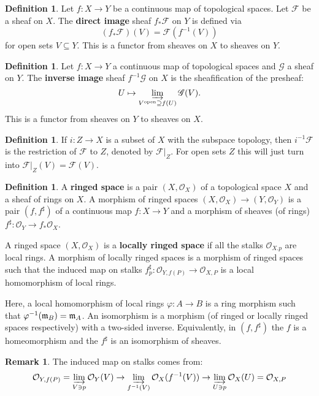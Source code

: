 \documentclass[10pt,reqno]{amsart}
\theoremstyle{definition}
\newtheorem{definition}[theorem]{Definition}
\newtheorem{remark}[theorem]{Remark}
\theoremstyle{remark}
\numberwithin{equation}{section}
\numberwithin{theorem}{section}
\newcommand{\OO}{{\mathcal O}}
\newcommand{\FF}{{\mathscr F}}
\newcommand{\GG}{{\mathscr G}}
\begin{document}
\begin{definition} Let $f: X \to Y$ be a continuous map of topological spaces. Let $\FF$ be a sheaf on $X$. The \textbf{direct image} sheaf $f_* \FF$ on $Y$ is defined via
\[(f_* \FF)(V) = \FF(f^{-1}(V))\]
for open sets $V \subseteq Y$. This is a functor from sheaves on $X$ to sheaves on $Y$.
\end{definition}

\begin{definition}
Let $f: X \to Y$ a continuous map of topological spaces and $\GG$ a sheaf on $Y$. The \textbf{inverse image} sheaf $f^{-1}\GG$ on $X$ is the sheafification of the presheaf:
\[U \mapsto \varinjlim_{V^{\textup{open}} \supseteq f(U)} \GG(V).\]
This is a functor from sheaves on $Y$ to sheaves on $X$.
\end{definition}

\begin{definition}
If $i: Z \to X$ is a subset of $X$ with the subspace topology, then $i^{-1}\FF$ is the restriction of $\FF$ to $Z$, denoted by $\FF|_{Z}$. For open sets $Z$ this will just turn into $\FF|_{Z}(V) = \FF(V)$.
\end{definition}

\begin{definition} A \textbf{ringed space} is a pair $(X,\OO_X)$ of a topological space $X$ and a sheaf of rings on $X$. A morphism of ringed spaces $(X,\OO_X) \to (Y,\OO_Y)$ is a pair $(f,f^{\sharp})$ of a continuous map $f: X \to Y$ and a morphism of sheaves (of rings) $f^{\sharp}: \OO_Y \to f_* \OO_X$.

A ringed space $(X,\OO_X)$ is a \textbf{locally ringed space} if all the stalks $\OO_{X.p}$ are local rings. A morphism of locally ringed spaces is a morphism of ringed spaces such that the induced map on stalks $f_p^{\sharp}: \OO_{Y, f(P)} \to \OO_{X,P}$ is a local homomorphism of local rings.

Here, a local homomorphism of local rings $\varphi: A \to B$ is a ring morphism such that $\varphi^{-1}(\frak{m}_B) = \frak{m}_A$. An isomorphism is a morphism (of ringed or locally ringed spaces respectively) with a two-sided inverse. Equivalently, in $(f,f^{\sharp})$ the $f$ is a homeomorphism and the $f^{\sharp}$ is an isomorphism of sheaves.
\end{definition}

\begin{remark} The induced map on stalks comes from:
\[\OO_{Y,f(P)} = \varinjlim_{V \ni p} \OO_Y(V) \to \varinjlim_{f^{-1}(V)} \OO_X(f^{-1}(V)) \to \varinjlim_{U \ni p} \OO_X(U) = \OO_{X,P}\]
\end{remark}
\end{document}
